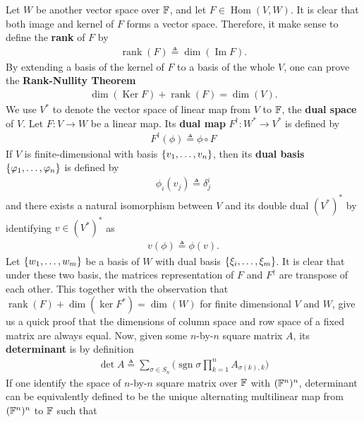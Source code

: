 \documentclass{report}
\begin{document}
Let $W$ be another vector space over  $\mathbb{F}$, and let $F \in \operatorname{Hom}(V,W)$. It is clear that  both image and kernel of $F$ forms a vector space. Therefore, it make sense to define the \textbf{rank} of $F$ by 
 \begin{align*}
\operatorname{rank}(F)\triangleq \operatorname{dim} (\operatorname{Im}F). 
\end{align*}
By extending a basis of the kernel of $F$ to a basis of the whole  $V$, one can prove the  \textbf{Rank-Nullity Theorem} 
\begin{align*}
\operatorname{dim}(\operatorname{Ker}F)+ \operatorname{rank}(F)= \operatorname{dim}(V). 
\end{align*}
We use $V^*$ to denote the vector space of linear map from  $V$ to  $\mathbb{F}$, the  \textbf{dual space} of $V$. Let $F:V\rightarrow W$ be a linear map. Its \textbf{dual map} $F^\dagger :W^*\rightarrow V^*$ is defined by 
\begin{align*}
F^\dagger (\phi)\triangleq \phi \circ F
\end{align*}
If $V$ is finite-dimensional with basis  $\{ v_1,\dots ,v_n \}$, then its \textbf{dual basis} $\{ \varphi_1,\dots ,\varphi_n \}$ is defined by 
\begin{align*}
\phi_i (v_j)\triangleq \delta^i_j
\end{align*}
and there exists a natural isomorphism between $V$ and its double dual  $(V^*)^*$ by identifying $v\in (V^*)^*$ as 
\begin{align*}
v(\phi) \triangleq \phi (v). 
\end{align*}
Let $\{ w_1,\dots ,w_m \}$ be a basis of $W$ with dual basis  $\{ \xi_i , \dots ,\xi_m \}$. It is clear that under these two basis, the matrices representation of $F$ and  $F^\dagger $ are transpose of each other. This together with the observation that $\operatorname{rank}(F)+ \operatorname{dim}(\operatorname{ker}F^*)= \operatorname{dim}(W)$ for finite dimensional $V$ and  $W$, give us a quick proof that the dimensions of column space and row space of a fixed matrix are always equal. Now, given some $n$-by-$n$ square matrix $A$, its \textbf{determinant} is by definition 
\begin{align*}
\operatorname{det}A\triangleq  \sum_{\sigma \in S_n} \Big(\operatorname{sgn}\sigma \prod_{k=1}^n  A_{\sigma (k),k} \Big)
\end{align*}
If one identify the space of $n$-by-$n$ square matrix over  $\mathbb{F}$ with  $(\mathbb{F}^n)^n$, determinant can be equivalently defined to be the unique alternating multilinear map from $(\mathbb{F}^n)^n$ to $\mathbb{F}$ such that 
\end{document}

